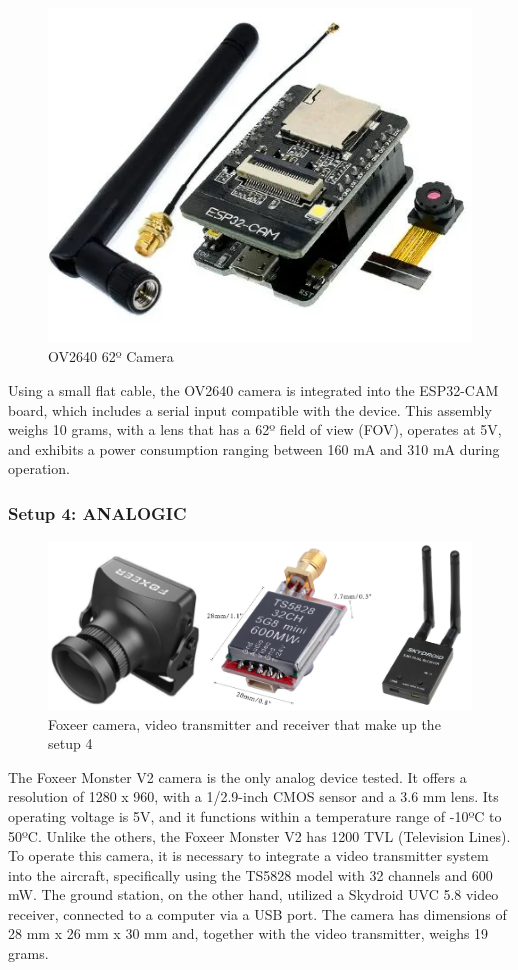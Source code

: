 \documentclass[letterpaper]{article}
\begin{document}
\begin{figure}[H]
\centering
\includegraphics[width=0.6\columnwidth]{images/setup_3.png}
\caption{OV2640 62º Camera}
\label{figure:setup_3}
\end{figure}

Using a small flat cable, the OV2640 camera is integrated into the ESP32-CAM board, which includes a serial input compatible with the device. This assembly weighs 10 grams, with a lens that has a 62º field of view (FOV), operates at 5V, and exhibits a power consumption ranging between 160 mA and 310 mA during operation.

\subsubsection{Setup 4: ANALOGIC}
\begin{figure}[H]
\centering
\includegraphics[width=0.6\columnwidth]{images/setup_4.png}
\caption{Foxeer camera, video transmitter and receiver that make up the setup 4}
\label{figure:setup_4}
\end{figure}

The Foxeer Monster V2 camera is the only analog device tested. It offers a resolution of 1280 x 960, with a 1/2.9-inch CMOS sensor and a 3.6 mm lens. Its operating voltage is 5V, and it functions within a temperature range of -10ºC to 50ºC. Unlike the others, the Foxeer Monster V2 has 1200 TVL (Television Lines). To operate this camera, it is necessary to integrate a video transmitter system into the aircraft, specifically using the TS5828 model with 32 channels and 600 mW. The ground station, on the other hand, utilized a Skydroid UVC 5.8 video receiver, connected to a computer via a USB port. The camera has dimensions of 28 mm x 26 mm x 30 mm and, together with the video transmitter, weighs 19 grams.
\end{document}
